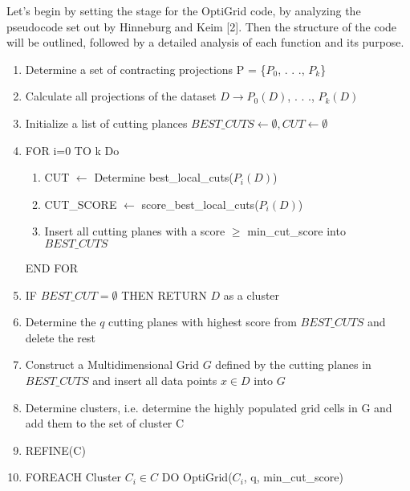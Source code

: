 
Let's begin by setting the stage for the OptiGrid code, by analyzing the pseudocode set out by Hinneburg and Keim [2]. Then the structure of the code will be outlined, followed by a detailed analysis of each function and its purpose.\newline
\begin{tcolorbox}[breakable, title={$OptiGrid(dataset~D,~q,~min\_cut\_score)$}]
    \footnotesize     
    \begin{enumerate}        
        \item Determine a set of contracting projections P = \{$P_0$, . . ., $P_k$\}
        \item Calculate all projections of the dataset $D \to P_{0}(D)$, . . ., $P_{k}(D)$
        \item Initialize a list of cutting plances $BEST\_CUTS \leftarrow \emptyset, CUT \leftarrow \emptyset$
        \item FOR i=0 TO k Do
        \begin{enumerate}
            \item CUT $\leftarrow$ Determine best\_local\_cuts($P_i(D)$)
            \item CUT\_SCORE $\leftarrow$ score\_best\_local\_cuts($P_i(D)$)
            \item Insert all cutting planes with a score $\geq$ min\_cut\_score into $BEST\_CUTS$            
        \end{enumerate}
        END FOR
        \item IF $BEST\_CUT = \emptyset$ THEN RETURN $D$ as a cluster
        \item Determine the $q$ cutting planes with highest score from $BEST\_CUTS$ and delete the rest
        \item Construct a Multidimensional Grid $G$ defined by the cutting planes in $BEST\_CUTS$ and insert all data points $x \in D$ into $G$
        \item Determine clusters, i.e. determine the highly populated grid cells in G and add them to the set of cluster C
        \item REFINE(C)
        \item FOREACH Cluster $C_i \in C$ DO\newline
        OptiGrid($C_i$, q, min\_cut\_score)
    \end{enumerate}    
\end{tcolorbox}
\normalsize


